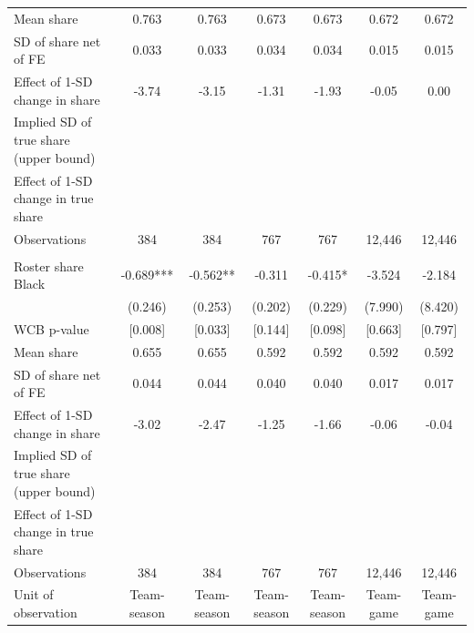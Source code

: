 \begin{table}[H]
{\begin{tabular}[t]{lcccccc}
\hspace{1em}Mean share & 0.763 & 0.763 & 0.673 & 0.673 & 0.672 & 0.672\\
\hspace{1em}SD of share net of FE & 0.033 & 0.033 & 0.034 & 0.034 & 0.015 & 0.015\\
\hspace{1em}Effect of 1-SD change in share & -3.74 & -3.15 & -1.31 & -1.93 & -0.05 & 0.00\\
\hspace{1em}Implied SD of true share (upper bound) &  &  &  &  &  \vphantom{1} & \\
\hspace{1em}Effect of 1-SD change in true share &  &  &  &  &  \vphantom{1} & \\
\hspace{1em}Observations & 384 & 384 & 767 & 767 & 12,446 & \vphantom{1} 12,446\\
\addlinespace[0pt]
\multicolumn{7}{l}{\textbf{Panel F: Predicted race, raked to TIDES margins}}\\
\hspace{1em}Roster share Black & -0.689*** & -0.562** & -0.311 & -0.415* & -3.524 & -2.184\\
\hspace{1em} & (0.246) & (0.253) & (0.202) & (0.229) & (7.990) & (8.420)\\
\hspace{1em}WCB p-value & {}[0.008] & {}[0.033] & {}[0.144] & {}[0.098] & {}[0.663] & {}[0.797]\\
\hspace{1em}Mean share & 0.655 & 0.655 & 0.592 & 0.592 & 0.592 & 0.592\\
\hspace{1em}SD of share net of FE & 0.044 & 0.044 & 0.040 & 0.040 & 0.017 & 0.017\\
\hspace{1em}Effect of 1-SD change in share & -3.02 & -2.47 & -1.25 & -1.66 & -0.06 & -0.04\\
\hspace{1em}Implied SD of true share (upper bound) &  &  &  &  &  & \\
\hspace{1em}Effect of 1-SD change in true share &  &  &  &  &  & \\
\hspace{1em}Observations & 384 & 384 & 767 & 767 & 12,446 & 12,446\\
\midrule
Unit of observation & Team-season & Team-season & Team-season & Team-season & Team-game & Team-game\\

\end{tabular}}
\end{table}
